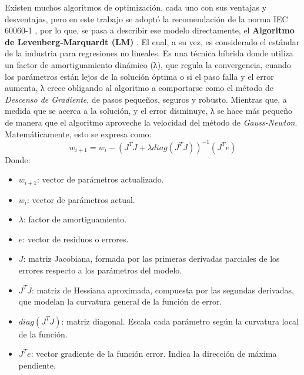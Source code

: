 Existen muchos algoritmos de optimización, cada uno con sus ventajas y desventajas, pero en este trabajo se adoptó la recomendación de la norma IEC 60060-1 \cite{iec60060_1}, por lo que, se pasa a describir ese modelo directamente, el \textbf{Algoritmo de Levenberg-Marquardt (LM)} \cite{Chapra2015}. El cual, a su vez, es considerado el estándar de la industria para regresiones no lineales. Es una técnica híbrida donde utiliza un factor de amortiguamiento dinámico (λ), que regula la convergencia, cuando los parámetros están lejos de la solución óptima o si el paso falla y el error aumenta, λ crece obligando al algoritmo a comportarse como el método de \emph{Descenso de Gradiente}, de pasos pequeños, seguros y robusto. Mientras que, a medida que se acerca a la solución, y el error disminuye, λ se hace más pequeño de manera que el algoritmo aproveche la velocidad del método de \emph{Gauss-Newton}. Matemáticamente, esto se expresa como:
\begin{equation}
    w_{i+1} = w_i - \left( J^T J + \lambda diag(J^T J) \right)^{-1} (J^T e)
\end{equation}
Donde:
\begin{itemize}[label={}, leftmargin=*]
    \item $w_{i+1}$: vector de parámetros actualizado.
    \item $w_i$: vector de parámetros actual.
    \item $\lambda$: factor de amortiguamiento.
    \item $e$: vector de residuos o errores.
    \item $J$: matriz Jacobiana, formada por las primeras derivadas parciales de los errores respecto a los parámetros del modelo.
    \item $J^T J$: matriz de Hessiana aproximada, compuesta por las segundas derivadas, que modelan la curvatura general de la función de error.
    \item $diag(J^T J)$: matriz diagonal. Escala cada parámetro según la curvatura local de la función.
    \item $J^T e$: vector gradiente de la función error. Indica la dirección de máxima pendiente.
\end{itemize}

